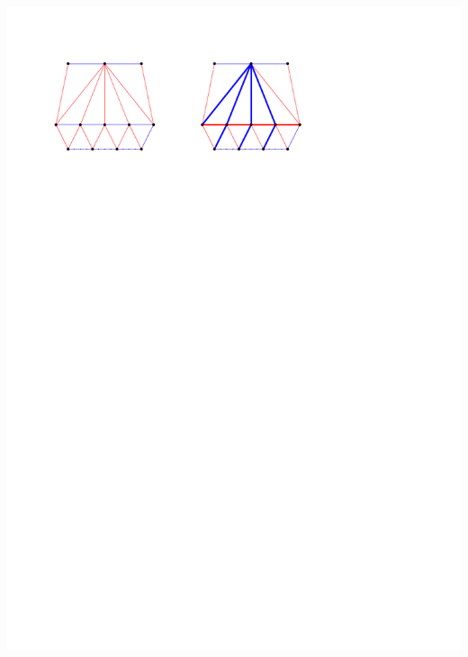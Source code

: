 \documentclass[a4paper]{article}
\begin{document}
\includegraphics[width =\textwidth]{topFanFlips/img/mergeend}
\clearpage%
\end{document}
